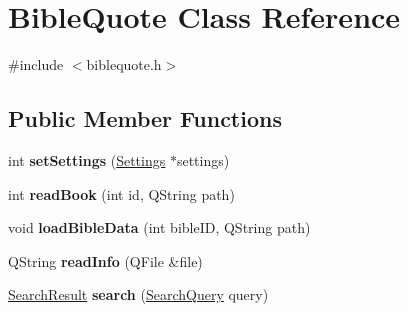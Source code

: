 \hypertarget{classBibleQuote}{
\section{BibleQuote Class Reference}
\label{classBibleQuote}
}


{\ttfamily \#include $<$biblequote.h$>$}

\subsection*{Public Member Functions}
\begin{DoxyCompactItemize}
\item 
\hypertarget{classBibleQuote_a3d20c298cc87364e6fb9abc67352dfb9}{
int {\bfseries setSettings} (\hyperlink{classSettings}{Settings} $\ast$settings)}
\label{classBibleQuote_a3d20c298cc87364e6fb9abc67352dfb9}

\item 
\hypertarget{classBibleQuote_a42af21eb619fd89ef9bc3b6b574b0b6c}{
int {\bfseries readBook} (int id, QString path)}
\label{classBibleQuote_a42af21eb619fd89ef9bc3b6b574b0b6c}

\item 
\hypertarget{classBibleQuote_a0f9c1eb1346380d3f8e21c9cdf76390d}{
void {\bfseries loadBibleData} (int bibleID, QString path)}
\label{classBibleQuote_a0f9c1eb1346380d3f8e21c9cdf76390d}

\item 
\hypertarget{classBibleQuote_af4bd0be7d2ebf2b3fddc60757acf556a}{
QString {\bfseries readInfo} (QFile \&file)}
\label{classBibleQuote_af4bd0be7d2ebf2b3fddc60757acf556a}

\item 
\hypertarget{classBibleQuote_ab87214e63ac373631c5867e6d58cd69c}{
\hyperlink{classSearchResult}{SearchResult} {\bfseries search} (\hyperlink{classSearchQuery}{SearchQuery} query)}
\label{classBibleQuote_ab87214e63ac373631c5867e6d58cd69c}

\end{DoxyCompactItemize}
